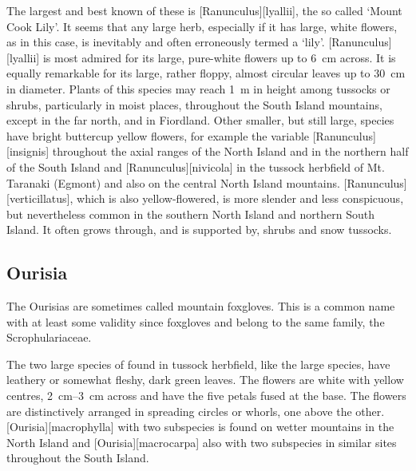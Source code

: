 The largest and best known of these is [Ranunculus][lyallii], the so called `Mount Cook Lily'.
It seems that any large herb, especially if it has large, white flowers, as in this case, is inevitably and often erroneously termed a `lily'. [Ranunculus][lyallii] is most admired for its large, pure-white flowers up to \SI{6}{\centi\metre} across.
It is equally remarkable for its large, rather floppy, almost circular leaves up to \SI{30}{\centi\metre} in diameter.
Plants of this species may reach \SI{1}{\metre} in height among tussocks or shrubs, particularly in moist places, throughout the South Island mountains, except in the far north, and in Fiordland.
Other smaller, but still large, species have bright buttercup yellow flowers, for example the variable [Ranunculus][insignis] throughout the axial ranges of the North Island and in the northern half of the South Island and [Ranunculus][nivicola] in the tussock herbfield of Mt.
Taranaki (Egmont) and also on the central North Island mountains. [Ranunculus][verticillatus], which is also yellow-flowered, is more slender and less conspicuous, but nevertheless common in the southern North Island and northern South Island.
It often grows through, and is supported by, shrubs and snow tussocks.

\subsection{Ourisia}

The Ourisias are sometimes called mountain foxgloves.
This is a common name with at least some validity since foxgloves and  belong to the same family, the Scrophulariaceae.

The two large species of  found in tussock herbfield, like the large  species, have leathery or somewhat fleshy, dark green leaves.
The flowers are white with yellow centres, \SIrange{2}{3}{\centi\metre} across and have the five petals fused at the base.
The flowers are distinctively arranged in spreading circles or whorls, one above the other. [Ourisia][macrophylla] with two subspecies is found on wetter mountains in the North Island and [Ourisia][macrocarpa] also with two subspecies in similar sites throughout the South Island.

